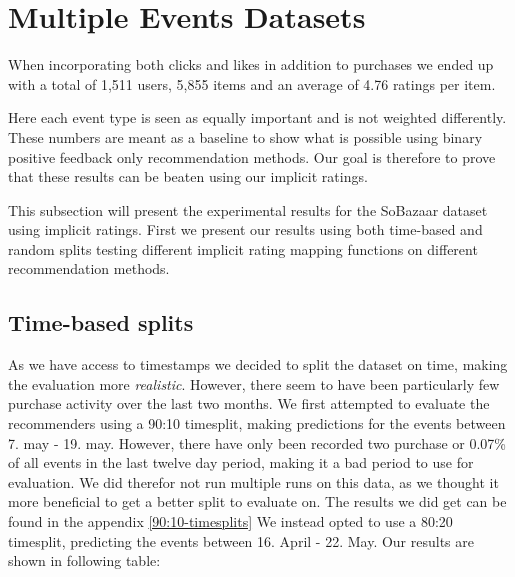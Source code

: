 \section{Multiple Events Datasets}

When incorporating both clicks and likes in addition to purchases we ended up with a total of 1,511 users, 5,855 items
and an average of 4.76 ratings per item.

Here each event type is seen as equally important and is not weighted differently.
These numbers are meant as a baseline to show what is possible using binary positive feedback only recommendation methods.
Our goal is therefore to prove that these results can be beaten using our implicit ratings.

This subsection will present the experimental results for the SoBazaar dataset using implicit ratings. First we present
our results using both time-based and random splits testing different implicit rating mapping functions on different recommendation methods.

\subsection{Time-based splits}

As we have access to timestamps we decided to split the dataset on time, making the evaluation more \textit{realistic}. However,
there seem to have been particularly few purchase activity over the last two months. We first attempted to evaluate the recommenders
using a 90:10 timesplit, making predictions for the events between 7. may - 19. may. However, there have only been recorded two purchase or 0.07\% of
all events in the last twelve day period, making it a bad period to use for evaluation. We did therefor not run multiple runs on this
data, as we thought it more beneficial to get a better split to evaluate on. The results we did get can be found in the appendix \ref{90:10-timesplits}
We instead opted to use a 80:20 timesplit, predicting the events between 16. April - 22. May. Our results are shown in following table:

